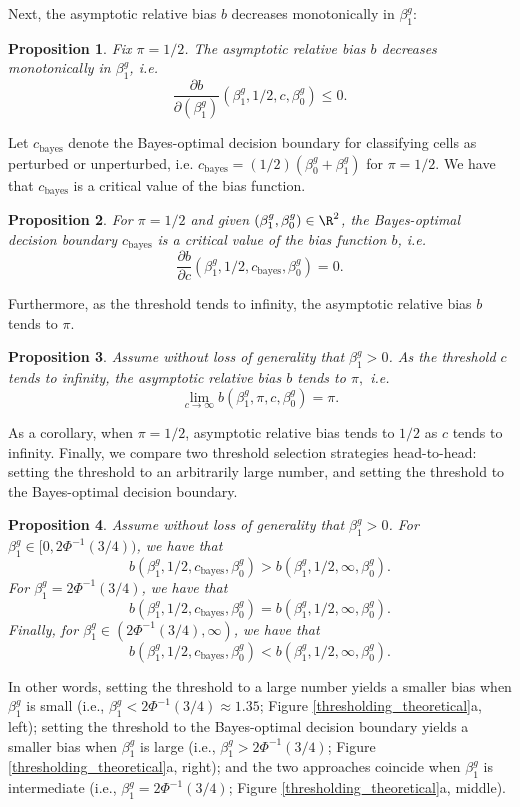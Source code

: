 \documentclass[11pt]{article}
\newtheorem{proposition}{Proposition}
\begin{document}
\begin{appendices}
\begin{refsection}
Next, the asymptotic relative bias $b$ decreases monotonically in $\beta^g_1:$
\begin{proposition}\label{prop:monotonic} Fix $\pi = 1/2$. The asymptotic relative bias $b$ decreases monotonically in $\beta_1^g$, i.e.
		$$\frac{\partial b}{\partial(\beta^g_1)}\left(\beta^g_1, 1/2, c, \beta^g_0\right) \leq 0.$$
\end{proposition}
Let $c_\textrm{bayes}$ denote the Bayes-optimal decision boundary for classifying cells as perturbed or unperturbed, i.e. $c_\textrm{bayes} = (1/2)(\beta^g_0 + \beta^g_1)$ for $\pi = 1/2$. We have that $c_\textrm{bayes}$ is a critical value of the bias function.
\begin{proposition}\label{prop:bayes_opt}
		For $\pi = 1/2$ and given $(\beta^g_1, \beta^g_0) \in \R^2$, the Bayes-optimal decision boundary $c_\textrm{bayes}$ is a critical value of the bias function $b$, i.e.
		$$ \frac{\partial b}{\partial c}\left(\beta^g_1, 1/2, c_\textrm{bayes}, \beta^g_0\right) = 0.$$
\end{proposition} Furthermore, as the threshold tends to infinity, the asymptotic relative bias $b$ tends to $\pi$.
\begin{proposition}\label{prop:c_limit}
	Assume without loss of generality that $\beta^g_1 > 0$. As the threshold $c$ tends to infinity, the asymptotic relative bias $b$ tends to $\pi,$ i.e.
	$$ \lim_{ c \to \infty } b(\beta^g_1, \pi, c, \beta^g_0) = \pi.$$
\end{proposition}
As a corollary, when $\pi = 1/2$, asymptotic relative bias tends to $1/2$ as $c$ tends to infinity. Finally, we compare two threshold selection strategies head-to-head: setting the threshold to an arbitrarily large number, and setting the threshold to the Bayes-optimal decision boundary.
\begin{proposition}\label{prop:comparison} Assume without loss of generality that $\beta^g_1 > 0$. For $\beta^g_1 \in [0, 2\Phi^{-1}(3/4))$, we have that $$b(\beta^g_1, 1/2, c_\textrm{bayes}, \beta^g_0) > b(\beta^g_1, 1/2, \infty, \beta^g_0).$$ For $\beta^g_1 = 2\Phi^{-1}(3/4)$, we have that $$b(\beta^g_1, 1/2, c_\textrm{bayes}, \beta^g_0) = b(\beta^g_1, 1/2, \infty, \beta^g_0).$$ Finally, for $\beta^g_1 \in (2\Phi^{-1}(3/4), \infty)$, we have that $$b(\beta^g_1, 1/2, c_\textrm{bayes}, \beta^g_0) < b(\beta^g_1, 1/2, \infty, \beta^g_0).$$
\end{proposition}
In other words, setting the threshold to a large number yields a smaller bias when $\beta^g_1$ is small (i.e., $\beta^g_1 < 2\Phi^{-1}(3/4) \approx 1.35$; Figure \ref{thresholding_theoretical}a, left); setting the threshold to the Bayes-optimal decision boundary yields a smaller bias when $\beta^g_1$ is large (i.e., $\beta^g_1 > 2\Phi^{-1}(3/4)$; Figure \ref{thresholding_theoretical}a, right); and the two approaches coincide when $\beta^g_1$ is intermediate (i.e., $\beta^g_1 = 2\Phi^{-1}(3/4)$; Figure \ref{thresholding_theoretical}a, middle).


\end{refsection}
\end{appendices}
\end{document}
